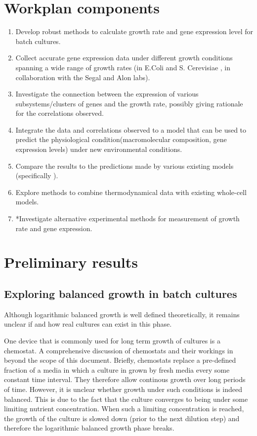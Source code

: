 \documentclass{report}
\begin{document}
\section{Workplan components}
\begin{enumerate}
\item Develop robust methods to calculate growth rate and gene expression level for batch cultures.
\item Collect accurate gene expression data under different growth conditions spanning a wide range of growth rates (in E.Coli and S. Cerevisiae , in collaboration with the Segal and Alon labs).
\item Investigate the connection between the expression of various subsystems/clusters of genes and the growth rate, possibly giving rationale for the correlations observed.
\item Integrate the data and correlations observed to a model that can be used to predict the physiological condition(macromolecular composition, gene expression levels) under new environmental conditions.
\item Compare the results to the predictions made by various existing models (specifically \cite{Lerman2012,Karr2012}).
\item Explore methods to combine thermodynamical data with existing whole-cell models.
\item *Investigate alternative experimental methods for measurement of growth rate and gene expression.
\end{enumerate}
\section{Preliminary results}
\subsection{Exploring balanced growth in batch cultures}
Although logarithmic balanced growth is well defined theoretically, it remains unclear if and how real cultures can exist in this phase.

One device that is commonly used for long term growth of cultures is a chemostat.
A comprehensive discussion of chemostats and their workings in beyond the scope of this document.
Briefly, chemostats replace a pre-defined fraction of a media in which a culture in grown by fresh media every some constant time interval.
They therefore allow continous growth over long periods of time.
However, it is unclear whether growth under such conditions is indeed balanced.
This is due to the fact that the culture converges to being under some limiting nutrient concentration.
When such a limiting concentration is reached, the growth of the culture is slowed down (prior to the next dilution step) and therefore the logarithmic balanced growth phase breaks.
\end{document}
